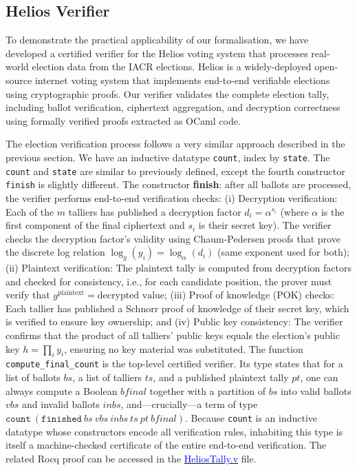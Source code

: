\subsection{Helios Verifier}
To demonstrate the practical applicability of our formalisation, we have developed a certified verifier for 
the Helios voting system that processes real-world election data from the IACR elections. Helios is a 
widely-deployed open-source internet voting system that implements end-to-end verifiable elections using 
cryptographic proofs. Our verifier validates the complete election tally, including ballot verification, ciphertext aggregation, and decryption correctness using formally verified proofs 
extracted as OCaml code. 

The election verification process follows a very similar approach described in the 
previous section. We have an inductive datatype \texttt{count}, index by \texttt{state}. 
The \texttt{count} and \texttt{state} are similar to previously defined, except the fourth constructor \texttt{finish} is 
slightly different. The constructor \textbf{finish}: after all ballots are processed, the verifier performs end-to-end 
verification checks: (i) Decryption verification: Each of the $m$ talliers has published a decryption factor $d_i = \alpha^{s_i}$ 
(where $\alpha$ is the first component of the final ciphertext and $s_i$ is their secret key). The verifier 
checks the decryption factor's validity using Chaum-Pedersen proofs that prove the discrete log relation 
$\log_g(y_i) = \log_\alpha(d_i)$ (same exponent used for both); (ii) Plaintext verification: The plaintext tally is computed from decryption factors and checked for 
consistency, i.e., for each candidate position, the prover must verify that $g^{\text{plaintext}} = \text{decrypted value}$; (iii) Proof of knowledge (POK) checks: Each tallier has published a Schnorr proof of knowledge of their 
secret key, which is verified to ensure key ownership; and (iv) Public key consistency: The verifier confirms that the product of all talliers' public keys equals 
the election's public key $h = \prod_i y_i$, ensuring no key material was substituted.  The function \texttt{compute\_final\_count} is the top-level certified
verifier. Its type states that for a list of ballots $\mathit{bs}$,
a list of talliers $\mathit{ts}$, and a published plaintext
tally $\mathit{pt}$, one can always compute a Boolean $\mathit{bfinal}$ together
with a partition of $\mathit{bs}$ into valid ballots $\mathit{vbs}$ and invalid
ballots $\mathit{inbs}$, and---crucially---a term of type
$\texttt{count}~(\texttt{finished}~\mathit{bs}~\mathit{vbs}~\mathit{inbs}~\mathit{ts}~\mathit{pt}~\mathit{bfinal})$.
Because \texttt{count} is an inductive datatype whose constructors encode all
verification rules, inhabiting this type is itself a machine-checked
certificate of the entire end-to-end verification. The related Rocq proof can be accessed in the \href{https://anonymous.4open.science/r/SigmaProtocol-EBA5/src/Backend/HeliosTally.v}{\textcolor{blue}{HeliosTally.v}} file.

